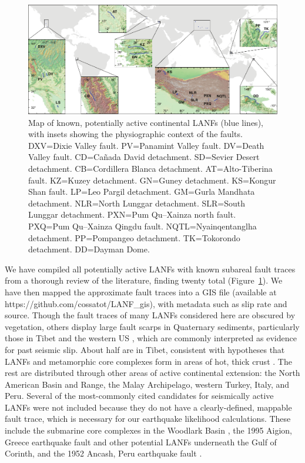 \documentclass[twocolumn,grl]{AGUTeX}
\begin{document}
\begin{article}
\begin{figure}%
\noindent\includegraphics[width=40pc]{./figures/active_lanfs_map_insets.pdf}
\caption{Map of known, potentially active continental LANFs (blue lines), with
insets showing the physiographic context of the faults.  DXV=Dixie Valley
fault.  PV=Panamint Valley fault.  DV=Death Valley fault.  CD=Ca\~nada David
detachment.  SD=Sevier Desert detachment.  CB=Cordillera Blanca detachment.  
AT=Alto-Tiberina fault.  KZ=Kuzey detachment.  GN=Guney detachment.  
KS=Kongur Shan fault.  LP=Leo Pargil detachment.  GM=Gurla Mandhata 
detachment. NLR=North Lunggar detachment.  SLR=South Lunggar detachment.  
PXN=Pum Qu--Xainza north fault.  PXQ=Pum Qu--Xainza Qingdu fault. 
NQTL=Nyainqentanglha detachment.  PP=Pompangeo detachment.  
TK=Tokorondo detachment.  DD=Dayman Dome.}
\label{fig:lanf_map}
\end{figure}

We have compiled all potentially active LANFs with known subareal fault traces
from a thorough review of the literature, finding twenty total
(Figure~\ref{fig:lanf_map}).  We have then mapped the approximate fault traces
into a GIS file (available at https://github.com/cossatot/LANF\_gis), with
metadata such as slip rate and source. Though the fault traces of many LANFs
considered here are obscured by vegetation, others display large fault scarps
in Quaternary sediments, particularly those in Tibet
\citep[e.g.,][]{styron2013slr, kapp2005nqtl} and the western US
\citep[e.g.,][]{axen1999baja, hayman2003dv}, which are commonly interpreted as
evidence for past seismic slip.  About half are in Tibet, consistent with
hypotheses that LANFs and metamorphic core complexes form in areas of hot,
thick crust \citep [e.g.,][]{buck1991mcc}.  The rest are distributed through
other areas of active continental extension: the North American Basin and
Range, the Malay Archipelago, western Turkey, Italy, and Peru. Several of the
most-commonly cited candidates for seismically active LANFs were not included
because they do not have a clearly-defined, mappable fault trace, which is
necessary for our earthquake likelihood calculations.  These include the
submarine core complexes in the Woodlark Basin \citep{abers2001}, the 1995
Aigion, Greece earthquake fault \citep{bernard1997} and other potential LANFs
underneath the Gulf of Corinth, and the 1952 Ancash, Peru earthquake fault
\citep{doser1987ancash}.



\end{article}
\end{document}
